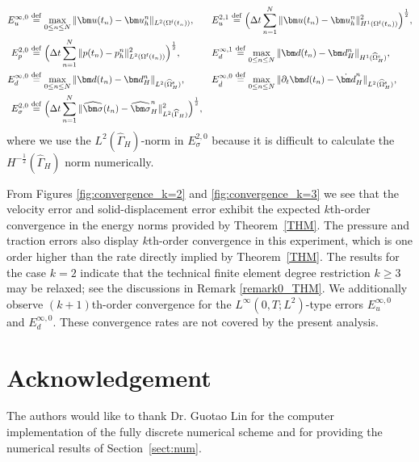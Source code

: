 \documentclass[11pt,reqno]{amsart}
\theoremstyle{definition}
\theoremstyle{plain}
\numberwithin{theorem}{section}
\numberwithin{proposition}{section}
\numberwithin{lemma}{section}
\numberwithin{equation}{section}
\renewcommand{\(}{\bigl(}
\renewcommand{\)}{\bigr)}
\def\eqd{\stackrel{\mathrm{def}}{=}}
\begin{document}
\begin{align*}
E_u^{\infty,0}
&\eqd
\max_{0\le n\le N}
\|\bm u(t_n)-\bm u_h^n\|_{L^2(\Omega^{\rm f}(t_n))},
&&
E_u^{2,1}
\eqd
\Big(
\Delta t\sum_{n=1}^N
\|\bm u(t_n)-\bm u_h^n\|_{H^1(\Omega^{\rm f}(t_n))}^2
\Big)^{\frac12},\\
E_p^{2,0}
&\eqd
\Big(
\Delta t\sum_{n=1}^N
\|p(t_n)-p_h^n\|_{L^2(\Omega^{\rm f}(t_n))}^2
\Big)^{\frac12}, 
&&
E_d^{\infty,1}
\eqd
\max_{0\le n\le N}
\|\bm d(t_n)-\bm d_H^n\|_{H^1(\widehat\Omega_H^{\rm s})},\\
E_d^{\infty,0}
&\eqd
\max_{0\le n\le N}
\|\bm d(t_n)-\bm d_H^n\|_{L^2(\widehat\Omega_H^{\rm s})}, 
&&
E_{\dot d}^{\infty,0}
\eqd
\max_{0\le n\le N}
\|\partial_t\bm d(t_n)-\dot{\bm d}_H^n\|_{L^2(\widehat\Omega_H^{\rm s})},\\
E_\sigma^{2,0}
&\eqd
\Big(
\Delta t\sum_{n=1}^N
\|\widehat{\bm\sigma}(t_n)-\widehat{\bm\sigma}_H^n\|_{L^2(\widehat\Gamma_H)}^2
\Big)^{\frac12} ,
\end{align*} 
where we use the $L^2(\widehat\Gamma_H)$-norm in $E_{\sigma}^{2,0}$ because it is difficult to calculate the $H^{-\frac12}(\widehat\Gamma_H)$ norm numerically. 



From Figures \ref{fig:convergence_k=2} and \ref{fig:convergence_k=3}  we see that the velocity error and solid-displacement error exhibit the expected $k$th-order convergence in the energy norms provided by Theorem~\ref{THM}. The pressure and traction errors also display $k$th-order convergence in this experiment, which is one order higher than the rate directly implied by Theorem~\ref{THM}.
The results for the case $k=2$ indicate that the technical finite element degree restriction $k\ge 3$ may be relaxed; see the discussions in Remark \ref{remark0_THM}. We additionally observe $(k+1)$th-order convergence for the $L^\infty(0,T;L^2)$-type errors $E_u^{\infty,0}$ and $E_d^{\infty,0}$. These convergence rates are not covered by the present analysis. 


\section*{Acknowledgement}
The authors would like to thank Dr. Guotao Lin for the computer implementation of  the fully discrete numerical scheme and for providing the numerical results of Section~\ref{sect:num}. 
 
\end{document}
